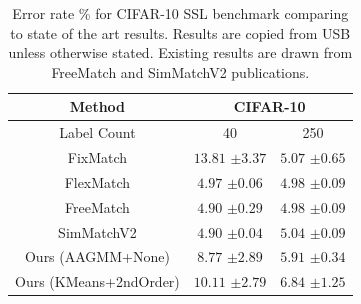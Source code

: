 \documentclass[10pt,twocolumn,letterpaper]{article}
\begin{document}
\begin{table}[htbp]
	\begin{tabular}{c|cc}
		Method          & \multicolumn{2}{c}{CIFAR-10} \\ \hline
		Label Count     & 40            & 250           \\
		\hline
		FixMatch\cite{sohn2020fixmatch}   & $13.81$ \scriptsize{$\pm3.37$}   & $5.07$ \scriptsize{$\pm0.65$}     \\
		FlexMatch\cite{zhang2021flexmatch}  & $4.97$ \scriptsize{$\pm0.06$}    & $4.98$ \scriptsize{$\pm0.09$}    \\
		FreeMatch\cite{wang2022freematch}  & $4.90$ \scriptsize{$\pm0.29$}    & $4.98$ \scriptsize{$\pm0.09$}    \\
		SimMatchV2\cite{zheng2023simmatchv2} & $4.90$ \scriptsize{$\pm0.04$}    & $5.04$ \scriptsize{$\pm0.09$}    \\ \hline
		Ours (AAGMM+None)    & $8.77$ \scriptsize{$\pm 2.89$}           & $5.91$ \scriptsize{$\pm 0.34$}  \\
		Ours (KMeans+2ndOrder)    & $10.11$ \scriptsize{$\pm 2.79$}           & $6.84$ \scriptsize{$\pm 1.25$}  
		
	\end{tabular}
	\caption{Error rate \% for CIFAR-10 SSL benchmark comparing to state of the art results. Results are copied from USB \cite{wang2022usb} unless otherwise stated. Existing results are drawn from FreeMatch\cite{wang2022freematch} and SimMatchV2\cite{zheng2023simmatchv2} publications.}
	\label{table2}
\end{table}
\end{document}
